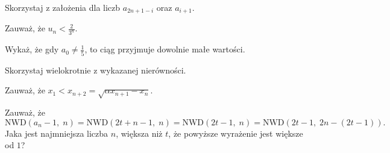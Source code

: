 
\begin{hints_list}
	\item *
	\item Skorzystaj z założenia dla liczb $a_{2n + 1 - i}$ oraz $a_{i + 1}$.
	\item Zauważ, że $u_n <  \frac{2}{3^{n}}$.
	\item Wykaż, że gdy $a_0 \neq \frac{1}{5}$, to ciąg przyjmuje dowolnie małe wartości.
	\item Skorzystaj wielokrotnie z wykazanej nierówności.
	\item Zauważ, że $x_1 < x_{n + 2} = \sqrt{\alpha x_{n+1} - x_n}$.
	\item Zauważ, że
	\[
		\mathrm{NWD}(a_n − 1,\; n) = \mathrm{NWD}(2t + n - 1,\; n) = \mathrm{NWD}(2t - 1,\; n) = \mathrm{NWD}(2t - 1,\; 2n - (2t - 1)).
	\]
	Jaka jest najmniejsza liczba $n$, większa niż $t$, że powyższe wyrażenie jest większe od $1$?
\end{hints_list}